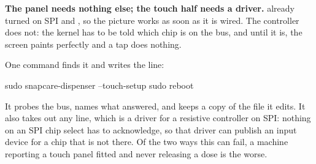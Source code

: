 \documentclass[11pt]{article}
\begin{document}
\begin{center}
\end{center}

\vspace{4mm}
\noindent\textbf{\sffamily The panel needs nothing else; the touch half needs a
driver.}  already turned on SPI and \iic{}, so the picture works
as soon as it is wired. The controller does not: the kernel has to be told which
chip is on the bus, and until it is, the screen paints perfectly and a tap does
nothing.

\vspace{2mm}
\noindent One command finds it and writes the line:

\begin{shell}
sudo snapcare-dispenser --touch-setup
sudo reboot
\end{shell}

\vspace{1mm}
\noindent It probes the bus, names what answered, and keeps a copy of the file
it edits. It also takes out any  line, which is a driver
for a resistive controller on SPI: nothing on an SPI chip select has to
acknowledge, so that driver can publish an input device for a chip that is not
there. Of the two ways this can fail, a machine reporting a touch panel fitted
and never releasing a dose is the worse.
\end{document}

